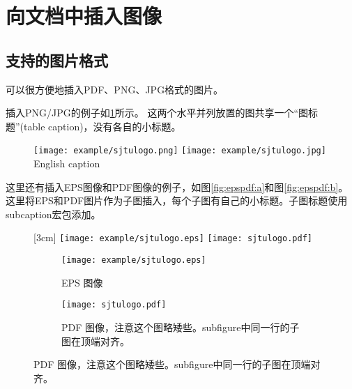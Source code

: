 \section{向文档中插入图像}
\label{sec:insertimage}

\subsection{支持的图片格式}
\label{sec:imageformat}

\XeTeX 可以很方便地插入PDF、PNG、JPG格式的图片。

插入PNG/JPG的例子如\ref{fig:SRR}所示。
这两个水平并列放置的图共享一个“图标题”(table caption)，没有各自的小标题。

\begin{figure}[!htp]
  \centering
  \texttt{[image: example/sjtulogo.png]}
  \hspace{1cm}
  \texttt{[image: example/sjtulogo.jpg]}
    {English caption}
  \label{fig:SRR}
\end{figure}

这里还有插入EPS图像和PDF图像的例子，如图\ref{fig:epspdf:a}和图\ref{fig:epspdf:b}。这里将EPS和PDF图片作为子图插入，每个子图有自己的小标题。子图标题使用subcaption宏包添加。

\begin{figure}[!htp]
  \centering
  [3cm] %
    {\texttt{[image: example/sjtulogo.eps]}}
  \hspace{4em}
    {\texttt{[image: sjtulogo.pdf]}}
  \label{fig:pdfeps-subcaptionbox}
\end{figure}

\begin{figure}[!htp]
  \centering
  \begin{subfigure}{2.5cm}
    \centering
    \texttt{[image: example/sjtulogo.eps]}
    \caption{EPS 图像}
  \end{subfigure}
  \hspace{4em}
  \begin{subfigure}{0.4\textwidth}
    \centering
    \texttt{[image: sjtulogo.pdf]}
    \caption{PDF 图像，注意这个图略矮些。subfigure中同一行的子图在顶端对齐。}
  \end{subfigure}
  \label{fig:pdfeps-subfigure}
\end{figure}

